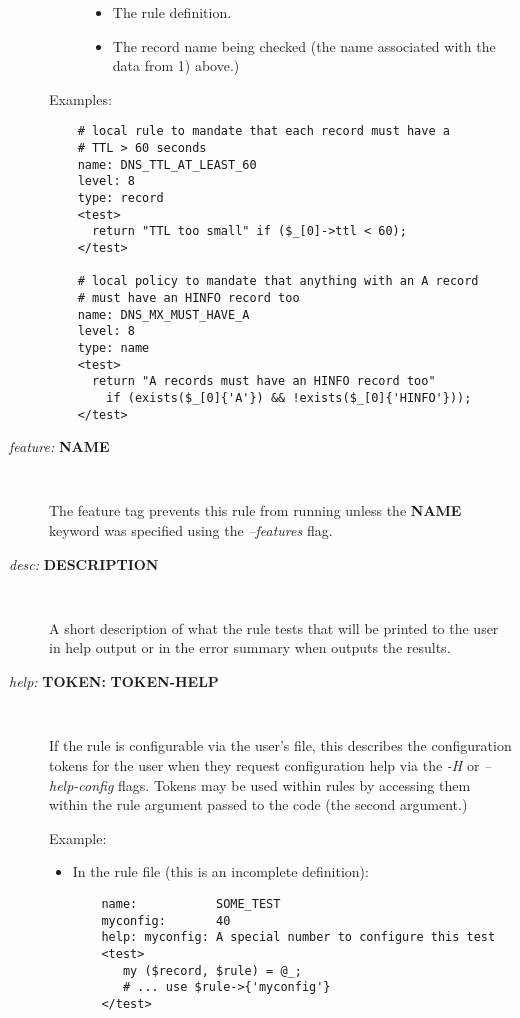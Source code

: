 \begin{description}
\begin{description}
\begin{itemize}
\item The rule definition.

\item The record name being checked (the name associated with
the data from 1) above.)
\end{itemize}

\end{description}

Examples:
\begin{verbatim}
    # local rule to mandate that each record must have a
    # TTL > 60 seconds
    name: DNS_TTL_AT_LEAST_60
    level: 8
    type: record
    <test>
      return "TTL too small" if ($_[0]->ttl < 60);
    </test>
  
    # local policy to mandate that anything with an A record
    # must have an HINFO record too
    name: DNS_MX_MUST_HAVE_A
    level: 8
    type: name
    <test>
      return "A records must have an HINFO record too"
        if (exists($_[0]{'A'}) && !exists($_[0]{'HINFO'}));
    </test>
\end{verbatim}

\item [{\it feature:} {\bf NAME}]\verb" "

The feature tag prevents this rule from running unless the {\bf NAME}
keyword was specified using the {\it --features} flag.

\item [{\it desc:} {\bf DESCRIPTION}]\verb" "

A short description of what the rule tests that will be printed to the
user in help output or in the error summary when  outputs the
results.

\item [{\it help:} {\bf TOKEN:} {\bf TOKEN-HELP}]\verb" "

If the rule is configurable via the user's  file, this
describes the configuration tokens for the user when they request
configuration help via the {\it -H} or {\it --help-config} flags.  Tokens
may be used within rules by accessing them within the rule argument passed to
the code (the second argument.)

Example:

\begin{itemize}

\item In the rule file (this is an incomplete definition):

\begin{verbatim}
    name:           SOME_TEST
    myconfig:       40
    help: myconfig: A special number to configure this test
    <test>
       my ($record, $rule) = @_;
       # ... use $rule->{'myconfig'}
    </test>
\end{verbatim}


\end{itemize}
\end{description}
